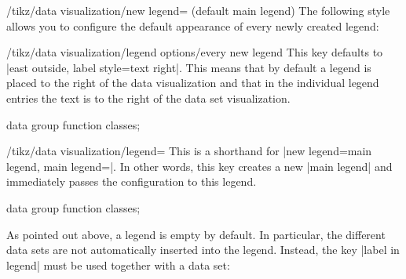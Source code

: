 \begin{key}{/tikz/data visualization/new legend= (default main legend)}
    The following style allows you to configure the default appearance of every
    newly created legend:
    \begin{stylekey}{/tikz/data visualization/legend options/every new legend}
        This key defaults to |east outside, label style=text right|. This means
        that by default a legend is placed to the right of the data
        visualization and that in the individual legend entries the text is to
        the right of the data set visualization.
    \end{stylekey}
\begin{codeexample}[width=6cm]
\tikz \datavisualization [
  scientific axes, x axis={label=$x$},
  visualize as smooth line/.list={log, lin, squared, exp},
  new legend={upper legend},
  new legend={lower legend},
  upper legend=above,
  lower legend=below,
  log=    {label in legend={text=$\log x$, legend=upper legend}},
  lin=    {label in legend={text=$x/2$, legend=upper legend}},
  squared={label in legend={text=$x^2$, legend=lower legend}},
  exp=    {label in legend={text=$e^x$, legend=lower legend}},
  style sheet=vary dashing]
data group {function classes};
\end{codeexample}
\end{key}

\begin{key}{/tikz/data visualization/legend=}
    This is a shorthand for
    |new legend=main legend, main legend=|. In other words, this
    key creates a new |main legend| and immediately passes the configuration
     to this legend.
\begin{codeexample}[width=7cm]
\tikz \datavisualization [
  scientific axes, x axis={label=$x$},
  visualize as smooth line/.list={log, lin, squared, exp},
  legend=below,
  log=    {label in legend={text=$\log x$}},
  lin=    {label in legend={text=$x/2$}},
  squared={label in legend={text=$x^2$}},
  exp=    {label in legend={text=$e^x$}},
  style sheet=vary dashing]
data group {function classes};
\end{codeexample}
\end{key}

As pointed out above, a legend is empty by default. In particular, the
different data sets are not automatically inserted into the legend. Instead,
the key |label in legend| must be used together with a data set:


